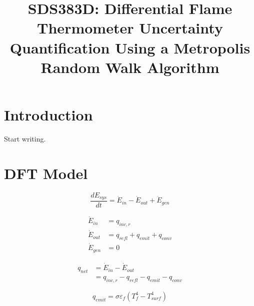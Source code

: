 \documentclass[article]{proc}
\begin{document}


\title{SDS383D: Differential Flame Thermometer Uncertainty Quantification Using a Metropolis Random Walk Algorithm}



\address[1]{Department of Mechanical Engineering, The University of Texas at Austin, Austin, TX 78712}




\maketitle
\section{Introduction}

    Start writing.

\section{DFT Model}

\begin{equation}\label{eq:energy_stored}
    \frac{dE_{sys}}{dt} = \dot{E}_{in} - \dot{E}_{out} + \dot{E}_{gen}
\end{equation}

\begin{align}\label{eq:dft_balance}
    \dot{E}_{in} &= q_{inc,r} \\
    \dot{E}_{out} &= q_{refl} + q_{emit} + q_{conv} \\
    \dot{E}_{gen} & = 0
\end{align}

\begin{align}\label{eq:q_net}
    q_{net} &= \dot{E}_{in} - \dot{E}_{out} \\
        &= q_{inc,r} - q_{refl} - q_{emit} - q_{conv}
\end{align}

\begin{equation}\label{eq:q_emit}
    q_{emit} = \sigma \varepsilon_f (T_f^4 - T_{surf}^4)
\end{equation}
\end{document}
